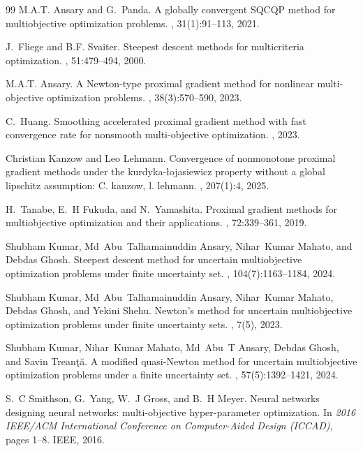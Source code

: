 \documentclass[smallextended,referee,envcountsect]{svjour3}
\begin{document}
\begin{thebibliography}{99}
M.A.T. Ansary and G.~Panda.
\newblock A globally convergent {SQCQP} method for multiobjective optimization problems.
, 31(1):91--113, 2021.

J.~Fliege and B.F. Svaiter.
\newblock Steepest descent methods for multicriteria optimization.
, 51:479--494, 2000.

M.A.T. Ansary.
\newblock A {Newton}-type proximal gradient method for nonlinear multi-objective optimization problems.
, 38(3):570--590, 2023.

C.~Huang.
\newblock Smoothing accelerated proximal gradient method with fast convergence rate for nonsmooth multi-objective optimization.
, 2023.

Christian Kanzow and Leo Lehmann.
\newblock Convergence of nonmonotone proximal gradient methods under the kurdyka-{\l}ojasiewicz property without a global lipschitz assumption: C. kanzow, l. lehmann.
, 207(1):4, 2025.

H.~Tanabe, E.~H Fukuda, and N.~Yamashita.
\newblock Proximal gradient methods for multiobjective optimization and their applications.
, 72:339--361, 2019.

Shubham Kumar, Md~Abu~Talhamainuddin Ansary, Nihar~Kumar Mahato, and Debdas Ghosh.
\newblock Steepest descent method for uncertain multiobjective optimization problems under finite uncertainty set.
, 104(7):1163--1184, 2024.

Shubham Kumar, Md~Abu~Talhamainuddin Ansary, Nihar~Kumar Mahato, Debdas Ghosh, and Yekini Shehu.
\newblock Newton's method for uncertain multiobjective optimization problems under finite uncertainty sets.
, 7(5), 2023.

Shubham Kumar, Nihar~Kumar Mahato, Md~Abu~T Ansary, Debdas Ghosh, and Savin Trean{\c{t}}{\u{a}}.
\newblock A modified {quasi-Newton} method for uncertain multiobjective optimization problems under a finite uncertainty set.
, 57(5):1392--1421, 2024.

S.~C Smithson, G.~Yang, W.~J Gross, and B.~H Meyer.
\newblock Neural networks designing neural networks: multi-objective hyper-parameter optimization.
\newblock In {\em 2016 IEEE/ACM International Conference on Computer-Aided Design (ICCAD)}, pages 1--8. IEEE, 2016.


\end{thebibliography}
\end{document}
